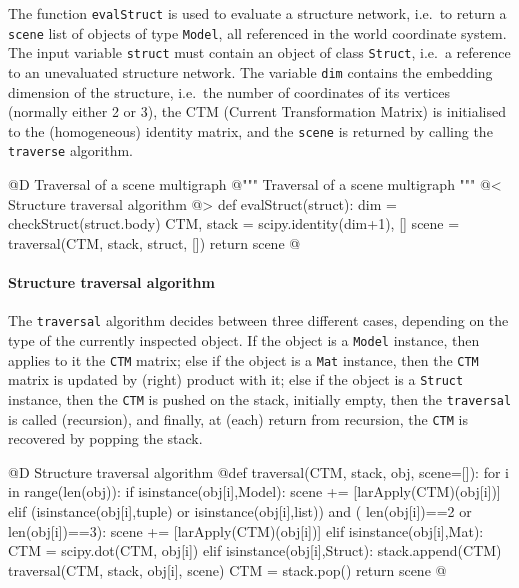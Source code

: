 \documentclass[11pt,oneside]{article}    %
\begin{document}
The function \texttt{evalStruct} is used to evaluate a structure network, i.e.~to return a \texttt{scene}
list of objects of type \texttt{Model}, all referenced in the world coordinate system. The input variable \texttt{struct} must contain an object of class \texttt{Struct}, i.e.~a reference to an unevaluated structure network. The variable \texttt{dim}  contains the embedding dimension of the structure, i.e.~the number of coordinates of its vertices (normally either 2 or 3), the CTM (Current Transformation Matrix) is initialised to the (homogeneous) identity matrix, and  the \texttt{scene} is returned by calling the \texttt{traverse} algorithm.

@D Traversal of a scene multigraph
@{""" Traversal of a scene multigraph """
@< Structure traversal algorithm @>
def evalStruct(struct):
    dim = checkStruct(struct.body)
    CTM, stack = scipy.identity(dim+1), []
    scene = traversal(CTM, stack, struct, []) 
    return scene
@}

\paragraph{Structure traversal algorithm}

The \texttt{traversal} algorithm decides between three different cases, depending on the type of the currently inspected object. If the object is a \texttt{Model} instance, then applies to it the \texttt{CTM} matrix; else if the object is a \texttt{Mat} instance, then the \texttt{CTM} matrix is updated by (right) product with it; else if the object is a \texttt{Struct} instance, then the \texttt{CTM} is pushed on the stack, initially empty, then the \texttt{traversal} is called (recursion), and finally, at (each) return from recursion, the \texttt{CTM} is recovered by popping the stack.

@D Structure traversal algorithm 
@{def traversal(CTM, stack, obj, scene=[]):
    for i in range(len(obj)):
        if isinstance(obj[i],Model): 
            scene += [larApply(CTM)(obj[i])]
        elif (isinstance(obj[i],tuple) or isinstance(obj[i],list)) and (
                len(obj[i])==2 or len(obj[i])==3):
            scene += [larApply(CTM)(obj[i])]
        elif isinstance(obj[i],Mat): 
            CTM = scipy.dot(CTM, obj[i])
        elif isinstance(obj[i],Struct):
            stack.append(CTM) 
            traversal(CTM, stack, obj[i], scene)
            CTM = stack.pop()
    return scene
@}
\end{document}
